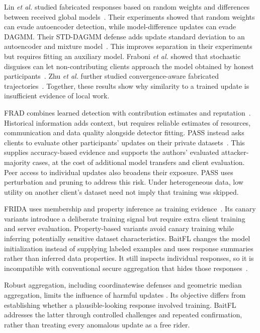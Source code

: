 \documentclass[conference]{IEEEtran}
\makeatletter
\renewcommand{\section}{\@startsection{section}{1}{\z@}{1.5ex}{0.7ex}{\normalfont\normalsize\centering\scshape}}
\makeatother
\begin{document}
\section{Related Work}
Lin \emph{et al.} studied fabricated responses based on random weights
and differences between received global models~\cite{lin2019freeriders}.
Their experiments showed that random weights can evade autoencoder
detection, while model-difference updates can evade DAGMM. Their
STD-DAGMM defense adds update standard deviation to an autoencoder and
mixture model~\cite{zong2018dagmm}. This improves separation in their
experiments but requires fitting an auxiliary model. Fraboni \emph{et al.}
showed that stochastic disguises can let non-contributing clients approach
the model obtained by honest participants~\cite{fraboni2021freerider}.
Zhu \emph{et al.} further studied convergence-aware fabricated
trajectories~\cite{zhu2021advanced}. Together, these results show why
similarity to a trained update is insufficient evidence of local work.

FRAD combines learned detection with contribution estimates and
reputation~\cite{wang2024frad}. Historical information adds context, but
requires reliable estimates of resources, communication and data quality
alongside detector fitting. PASS instead asks clients to evaluate other
participants' updates on their private datasets~\cite{wang2024pass}.
This supplies accuracy-based evidence and supports the authors' evaluated
attacker-majority cases, at the cost of additional model transfers and
client evaluation. Peer access to individual updates also broadens their
exposure. PASS uses perturbation and pruning to address this risk.
Under heterogeneous data, low utility on another client's dataset need
not imply that training was skipped.

FRIDA uses membership and property inference as training
evidence~\cite{recasens2026frida}. Its canary variants introduce a
deliberate training signal but require extra client training and server
evaluation. Property-based variants avoid canary training while inferring
potentially sensitive dataset characteristics. BaitFL changes the model
initialization instead of supplying labeled examples and uses response
summaries rather than inferred data properties. It still inspects individual
responses, so it is incompatible with conventional secure aggregation
that hides those responses~\cite{bonawitz2017practical}.

Robust aggregation, including coordinatewise defenses and geometric
median aggregation, limits the influence of harmful updates
\cite{yin2018byzantine,pillutla2022rfa}. Its objective differs from
establishing whether a plausible-looking response involved training.
BaitFL addresses the latter through controlled challenges and repeated
confirmation, rather than treating every anomalous update as a free rider.
\end{document}
